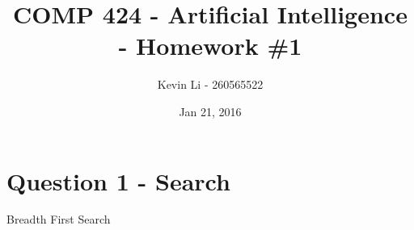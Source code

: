 \documentclass{article}
\title{COMP 424 - Artificial Intelligence - Homework \#1}
\author{Kevin Li - 260565522}
\date{Jan 21, 2016}
\begin{document}
\maketitle
\newpage

\section{Question 1 - Search}
    \begin{description}
        \item[Breadth First Search]
            
    \end{description}
\end{document}
